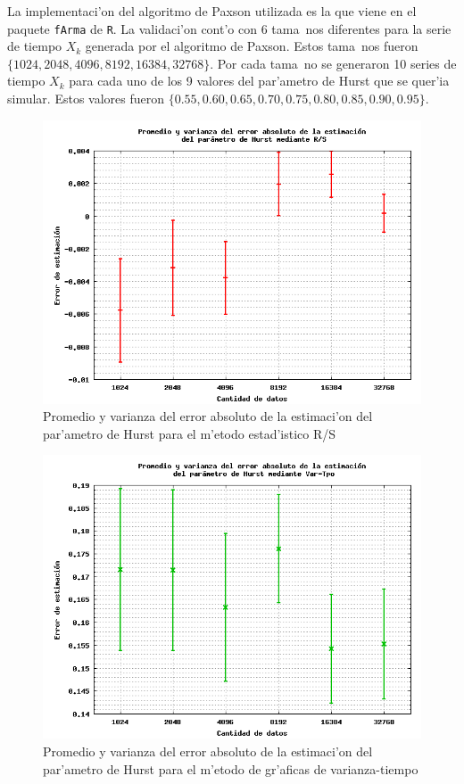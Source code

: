 La implementaci'on del algoritmo de Paxson utilizada es la que viene en el 
paquete {\tt fArma} de {\tt R}. La validaci'on cont'o con 6 tama~nos diferentes
para la serie de tiempo $X_k$ generada por el algoritmo de Paxson. Estos 
tama~nos fueron $\{1024, 2048, 4096, 8192, 16384, 32768\}$. Por cada tama~no se
generaron 10 series de tiempo $X_k$ para cada uno de los 9 valores del
par'ametro de Hurst que se quer'ia simular. Estos valores fueron
$\{0.55, 0.60, 0.65, 0.70, 0.75, 0.80, 0.85, 0.90, 0.95 \}$. 
\begin{figure}[htb]
\centering
\includegraphics[scale=0.45,type=png,ext=.png,read=.png]{figures/abserror-rs}
\caption{Promedio y varianza del error absoluto de la estimaci'on del par'ametro
de Hurst para el m'etodo estad'istico R/S}
\label{fig:abserrrs}
\end{figure}

\begin{figure}[htb]
\centering
\includegraphics[scale=0.45,type=png,ext=.png,read=.png]{figures/abserror-var}
\caption{Promedio y varianza del error absoluto de la estimaci'on del par'ametro
de Hurst para el m'etodo de gr'aficas de varianza-tiempo}
\label{fig:abserrvar}
\end{figure}

